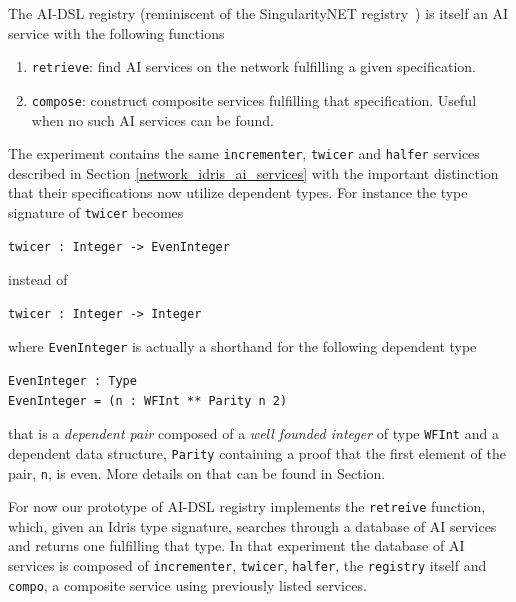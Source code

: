 \documentclass[]{report}
\newcommand{\nil}[2][]{\todo[color=purple,author=nil, #1]{#2}}
\begin{document}
The AI-DSL registry (reminiscent of the SingularityNET
registry~\cite{TODO}) is itself an AI service with the following functions
\begin{enumerate}
\item \texttt{retrieve}: find AI services on the network fulfilling a
  given specification.
\item \texttt{compose}: construct composite services fulfilling that
  specification.  Useful when no such AI services can be found.
\end{enumerate}

The experiment contains the same \texttt{incrementer}, \texttt{twicer}
and \texttt{halfer} services described in Section
\ref{network_idris_ai_services} with the important distinction that
their specifications now utilize dependent types.  For instance the
type signature of \texttt{twicer} becomes
\begin{verbatim}
twicer : Integer -> EvenInteger
\end{verbatim}
instead of
\begin{verbatim}
twicer : Integer -> Integer
\end{verbatim}
where \texttt{EvenInteger} is actually a shorthand for the following
dependent type
\begin{verbatim}
EvenInteger : Type
EvenInteger = (n : WFInt ** Parity n 2)
\end{verbatim}
that is a \emph{dependent pair} composed of a \emph{well founded
integer} of type \texttt{WFInt} and a dependent data structure,
\texttt{Parity} containing a proof that the first element of the pair,
\texttt{n}, is even.  More details on that can be found in
Section\nil{Add ref to Sam's work}.

For now our prototype of AI-DSL registry implements the
\texttt{retreive} function, which, given an Idris type signature,
searches through a database of AI services and returns one fulfilling
that type.  In that experiment the database of AI services is composed
of \texttt{incrementer}, \texttt{twicer}, \texttt{halfer}, the
\texttt{registry} itself and \texttt{compo}, a composite service using
previously listed services.
\end{document}

